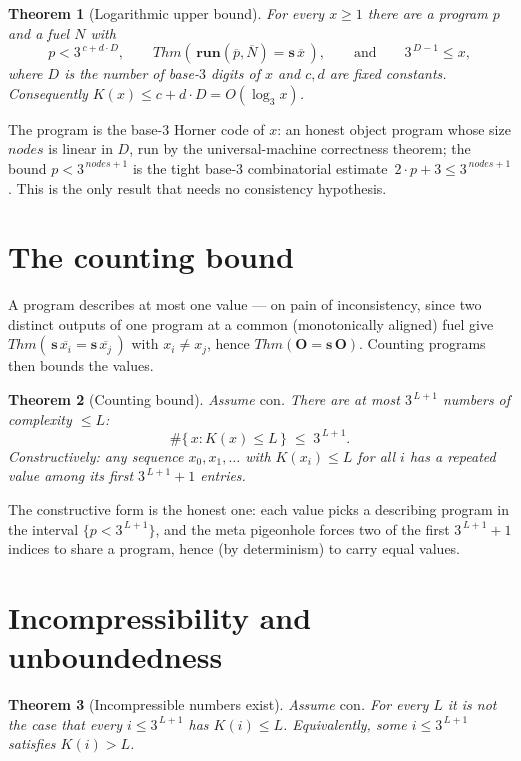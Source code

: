 \documentclass[11pt]{article}
\theoremstyle{plain}
\newtheorem{theorem}{Theorem}[section]
\theoremstyle{definition}
\theoremstyle{remark}
\newcommand{\run}{\mathbf{run}}
\newcommand{\Thm}[1]{\mathit{Thm}(#1)}
\newcommand{\Kc}{K}
\newcommand{\nodes}{\mathit{nodes}}
\begin{document}
\begin{theorem}[Logarithmic upper bound]\label{thm:upper}
For every $x\ge 1$ there are a program $p$ and a fuel $N$ with
\[
  p<3^{\,c+d\cdot D},\qquad
  \Thm{\,\run(\overline p,\overline N)=\mathbf{s}\,\overline x\,},
  \qquad\text{and}\qquad 3^{\,D-1}\le x,
\]
where $D$ is the number of base-$3$ digits of $x$ and $c,d$ are fixed
constants. Consequently $\Kc(x)\le c+d\cdot D = O(\log_3 x)$.
\end{theorem}

The program is the base-$3$ Horner code of $x$: an honest object program
whose size $\nodes$ is linear in $D$, run by the universal-machine
correctness theorem; the bound $p<3^{\,\nodes+1}$ is the tight base-$3$
combinatorial estimate $\,2\cdot p+3\le 3^{\,\nodes+1}$. This is the only
result that needs no consistency hypothesis.

\section{The counting bound}

A program describes at most one value --- on pain of inconsistency, since
two distinct outputs of one program at a common (monotonically aligned)
fuel give $\Thm{\,\mathbf{s}\,\overline{x_i}=\mathbf{s}\,\overline{x_j}\,}$
with $x_i\neq x_j$, hence $\Thm{\mathbf{O}=\mathbf{s}\,\mathbf{O}}$. Counting
programs then bounds the values.

\begin{theorem}[Counting bound]\label{thm:count}
Assume $\mathrm{con}$. There are at most $3^{\,L+1}$ numbers of complexity
$\le L$:
\[
  \#\{\,x:\Kc(x)\le L\,\}\;\le\;3^{\,L+1}.
\]
Constructively: any sequence $x_0,x_1,\dots$ with $\Kc(x_i)\le L$ for all
$i$ has a repeated value among its first $3^{\,L+1}+1$ entries.
\end{theorem}

The constructive form is the honest one: each value picks a describing
program in the interval $\{p<3^{\,L+1}\}$, and the meta pigeonhole forces
two of the first $3^{\,L+1}+1$ indices to share a program, hence (by
determinism) to carry equal values.

\section{Incompressibility and unboundedness}

\begin{theorem}[Incompressible numbers exist]\label{thm:incompress}
Assume $\mathrm{con}$. For every $L$ it is not the case that every $i\le
3^{\,L+1}$ has $\Kc(i)\le L$. Equivalently, some $i\le 3^{\,L+1}$ satisfies
$\Kc(i)>L$.
\end{theorem}
\end{document}
